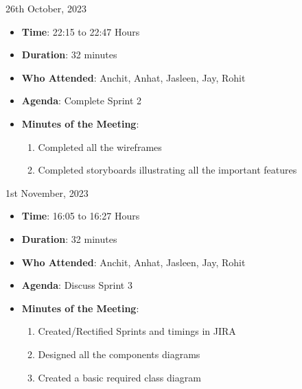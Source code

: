 \vspace{0.5cm}

\begin{myhbox}{26th October, 2023}
    \begin{itemize}
        \item \textbf{Time}: 22:15 to 22:47 Hours
        \item \textbf{Duration}: 32 minutes
        \item \textbf{Who Attended}: Anchit, Anhat, Jasleen, Jay, Rohit
        \item \textbf{Agenda}: Complete Sprint 2
        \vspace{0.5cm}
        \item \textbf{Minutes of the Meeting}:
            \begin{enumerate}
                \item Completed all the wireframes
                \item Completed storyboards illustrating all the important features
            \end{enumerate}
    \end{itemize}
\end{myhbox}

\vspace{0.5cm}

\begin{myhbox}{1st November, 2023}
    \begin{itemize}
        \item \textbf{Time}: 16:05 to 16:27 Hours
        \item \textbf{Duration}: 32 minutes
        \item \textbf{Who Attended}: Anchit, Anhat, Jasleen, Jay, Rohit
        \item \textbf{Agenda}: Discuss Sprint 3
        \vspace{0.5cm}
        \item \textbf{Minutes of the Meeting}:
            \begin{enumerate}
                \item Created/Rectified Sprints and timings in JIRA
                \item Designed all the components diagrams
                \item Created a basic required class diagram
            \end{enumerate}
    \end{itemize}
\end{myhbox}